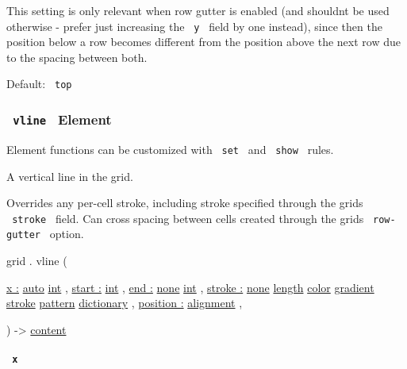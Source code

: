 This setting is only relevant when row gutter is enabled (and
shouldn\textquotesingle t be used otherwise - prefer just increasing the
\texttt{\ y\ } field by one instead), since then the position below a
row becomes different from the position above the next row due to the
spacing between both.

Default: \texttt{\ top\ }

\subsubsection{\texorpdfstring{\texttt{\ vline\ } {{ Element
}}}{ vline   Element }}\label{definitions-vline}

\label{definitions-vline-element-tooltip}
Element functions can be customized with \texttt{\ set\ } and
\texttt{\ show\ } rules.

A vertical line in the grid.

Overrides any per-cell stroke, including stroke specified through the
grid\textquotesingle s \texttt{\ stroke\ } field. Can cross spacing
between cells created through the grid\textquotesingle s
\texttt{\ row-gutter\ } option.

grid { . } { vline } (

{ \hyperref[definitions-vline-parameters-x]{x :}
\href{/docs/reference/foundations/auto/}{auto}
\href{/docs/reference/foundations/int/}{int} , } {
\hyperref[definitions-vline-parameters-start]{start :}
\href{/docs/reference/foundations/int/}{int} , } {
\hyperref[definitions-vline-parameters-end]{end :}
\href{/docs/reference/foundations/none/}{none}
\href{/docs/reference/foundations/int/}{int} , } {
\hyperref[definitions-vline-parameters-stroke]{stroke :}
\href{/docs/reference/foundations/none/}{none}
\href{/docs/reference/layout/length/}{length}
\href{/docs/reference/visualize/color/}{color}
\href{/docs/reference/visualize/gradient/}{gradient}
\href{/docs/reference/visualize/stroke/}{stroke}
\href{/docs/reference/visualize/pattern/}{pattern}
\href{/docs/reference/foundations/dictionary/}{dictionary} , } {
\hyperref[definitions-vline-parameters-position]{position :}
\href{/docs/reference/layout/alignment/}{alignment} , }

) -\textgreater{} \href{/docs/reference/foundations/content/}{content}

\paragraph{\texorpdfstring{\texttt{\ x\ }}{ x }}\label{definitions-vline-x}

